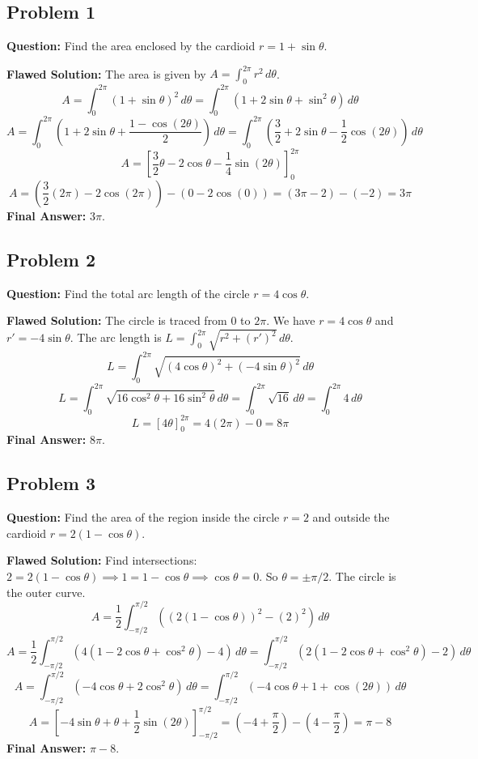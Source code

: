 \documentclass{article}
\begin{document}
\subsection{Problem 1}
\textbf{Question:} Find the area enclosed by the cardioid $r = 1 + \sin\theta$.

\textbf{Flawed Solution:}
The area is given by $A = \int_0^{2\pi} r^2 \,d\theta$.
\[ A = \int_0^{2\pi} (1 + \sin\theta)^2 \,d\theta = \int_0^{2\pi} (1 + 2\sin\theta + \sin^2\theta) \,d\theta \]
\[ A = \int_0^{2\pi} \left(1 + 2\sin\theta + \frac{1-\cos(2\theta)}{2}\right) \,d\theta = \int_0^{2\pi} \left(\frac{3}{2} + 2\sin\theta - \frac{1}{2}\cos(2\theta)\right) \,d\theta \]
\[ A = \left[\frac{3}{2}\theta - 2\cos\theta - \frac{1}{4}\sin(2\theta)\right]_0^{2\pi} \]
\[ A = (\frac{3}{2}(2\pi) - 2\cos(2\pi)) - (0 - 2\cos(0)) = (3\pi - 2) - (-2) = 3\pi \]
\textbf{Final Answer:} $3\pi$.

\subsection{Problem 2}
\textbf{Question:} Find the total arc length of the circle $r = 4\cos\theta$.

\textbf{Flawed Solution:}
The circle is traced from $0$ to $2\pi$. We have $r = 4\cos\theta$ and $r' = -4\sin\theta$.
The arc length is $L = \int_0^{2\pi} \sqrt{r^2 + (r')^2} \,d\theta$.
\[ L = \int_0^{2\pi} \sqrt{(4\cos\theta)^2 + (-4\sin\theta)^2} \,d\theta \]
\[ L = \int_0^{2\pi} \sqrt{16\cos^2\theta + 16\sin^2\theta} \,d\theta = \int_0^{2\pi} \sqrt{16} \,d\theta = \int_0^{2\pi} 4 \,d\theta \]
\[ L = [4\theta]_0^{2\pi} = 4(2\pi) - 0 = 8\pi \]
\textbf{Final Answer:} $8\pi$.

\subsection{Problem 3}
\textbf{Question:} Find the area of the region inside the circle $r=2$ and outside the cardioid $r = 2(1-\cos\theta)$.

\textbf{Flawed Solution:}
Find intersections: $2 = 2(1-\cos\theta) \implies 1 = 1-\cos\theta \implies \cos\theta = 0$. So $\theta = \pm \pi/2$.
The circle is the outer curve.
\[ A = \frac{1}{2} \int_{-\pi/2}^{\pi/2} \left( (2(1-\cos\theta))^2 - (2)^2 \right) \,d\theta \]
\[ A = \frac{1}{2} \int_{-\pi/2}^{\pi/2} (4(1-2\cos\theta+\cos^2\theta) - 4) \,d\theta = \int_{-\pi/2}^{\pi/2} (2(1-2\cos\theta+\cos^2\theta) - 2) \,d\theta \]
\[ A = \int_{-\pi/2}^{\pi/2} (-4\cos\theta + 2\cos^2\theta) \,d\theta = \int_{-\pi/2}^{\pi/2} (-4\cos\theta + 1 + \cos(2\theta)) \,d\theta \]
\[ A = [-4\sin\theta + \theta + \frac{1}{2}\sin(2\theta)]_{-\pi/2}^{\pi/2} = (-4 + \frac{\pi}{2}) - (4 - \frac{\pi}{2}) = \pi - 8 \]
\textbf{Final Answer:} $\pi - 8$.
\end{document}
